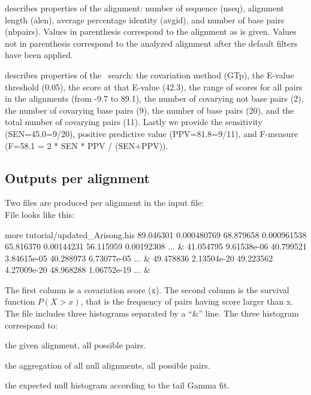\begin{sreitems}{}
\item[\emprog{First comment line}]describes properties of the
  alignment: number of sequence (nseq), alignment length (alen),
  average percentage identity (avgid), and number of base pairs
  (nbpairs).  Values in parenthesis correspond to the alignment as is
  given. Values not in parenthesis correspond to the analyzed
  alignment after the default filters have been applied.

\item[\emprog{Second comment line}]describes properties of the
  \rscape\ search: the covariation method (GTp), the E-value threshold
  (0.05), the score at that E-value (42.3), the range of scores for all
  pairs in the alignments (from -9.7 to 89.1), the number of covarying
  not base pairs (2), the number of covarying base pairs (9), the
  number of base pairs (20), and the total number of covarying pairs
  (11). Lastly we provide the sensitivity (SEN=45.0=9/20), positive
  predictive value (PPV=81.8=9/11), and F-measure (F=58.1 = 2 * SEN *
  PPV / (SEN+PPV)).
\end{sreitems}


\subsection{Outputs per alignment}
Two files are produced per alignment in the input file: \\

File  looks like this:
\begin{sreoutput}
more tutorial/updated_Arisong.his
89.046301       0.000480769
68.879658       0.000961538
65.816370       0.00144231
56.115959       0.00192308
...
&
41.054795       9.61538e-06
40.799521       3.84615e-05
40.288973       6.73077e-05
...
&
49.478836       2.13504e-20
49.223562       4.27009e-20
48.968288       1.06752e-19
...
&
\end{sreoutput}
The first column is a covariation score (x). The second column is the
survival function $P(X > x)$, that is the frequency of pairs having
score larger than x. The file includes three histograms separated by a
``\&'' line. The three histogram correspond to:

\begin{sreitems}{}
\item[\emprog{First histogram}] the given alignment, all possible pairs.
\item[\emprog{Second histogram}] the aggregation of all null alignments, all possible pairs.
\item[\emprog{Third histogram}] the expected null histogram according to the tail Gamma fit.
\end{sreitems}


